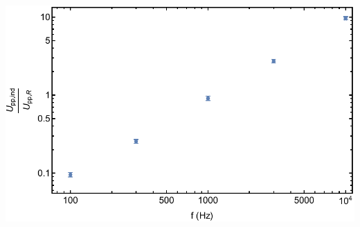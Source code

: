 \documentclass[prb,12pt]{revtex4-2}
\theoremstyle{definition}
\theoremstyle{definition}
\begin{document}
\begin{center}
	\includegraphics[width=	\textwidth]{plt3.pdf}
\end{center}
\end{document}
